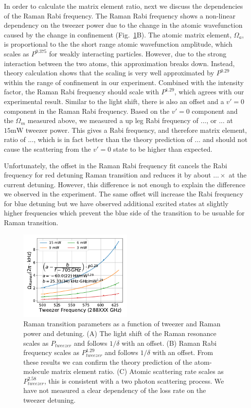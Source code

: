 \documentclass[aps,prl,twocolumn,groupedaddress]{revtex4-1}
\begin{document}
In order to calculate the matrix element ratio,
next we discuss the dependencies of the Raman Rabi frequency.
The Raman Rabi frequency shows a non-linear dependency on the tweezer power due to the change
in the atomic wavefunction caused by the change in confinement (Fig.~\ref{f-det}B).
The atomic matrix element, $\Omega_a$,
is proportional to the the short range atomic wavefunction amplitude,
which scales as $P^{0.375}$ for weakly interacting particles.
However, due to the strong interaction between the two atoms, this approximation breaks down.
Instead, theory calculation shows that the scaling is very well approximated by $P^{0.29}$
within the range of confinement in our experiment.
Combined with the intensity factor, the Raman Rabi frequency should scale with $P^{1.29}$,
which agrees with our experimental result.
Similar to the light shift, there is also an offset and
a $v'=0$ component in the Raman Rabi frequency.
Based on the $v'=0$ component and the $\Omega_m$ measured above,
we measured a up leg Rabi frequency of $...$, or $...$ at $15 \mathrm{mW}$ tweezer power.
This gives a Rabi frequency, and therefore matrix element, ratio of $...$,
which is in fact better than the theory prediction of $...$
and should not cause the scattering from the $v'=0$ state to be higher than expected.

Unfortunately, the offset in the Raman Rabi frequency fit cancels
the Rabi frequency for red detuning Raman transition and reduces it by about $...\times$
at the current detuning. However, this difference is not enough to explain
the difference we observed in the experiment.
The same offset will increase the Rabi frequency for blue detuning
but we have observed additional excited states at slightly higher frequencies
which prevent the blue side of the transition to be usuable for Raman transition.

\begin{figure}
  \includegraphics[height=4.5cm]{fig4.pdf}
  \caption{Raman transition parameters as a function of tweezer and Raman power and detuning.
    (A) The light shift of the Raman resonance scales as $P_{tweezer}$
    and follows $1/\delta$ with an offset.
    (B) Raman Rabi frequency scales as $P_{tweezer}^{1.29}$ and follows $1/\delta$ with an offset.
    From these results we can confirm the theory prediction of
    the atom-molecule matrix element ratio.
    (C) Atomic scattering rate scales as $P_{tweezer}^{2.58}$,
    this is consistent with a two photon scattering process.
    We have not measured a clear dependency of the loss rate on the tweezer detuning.
    \label{f-det}}
\end{figure}
\end{document}
